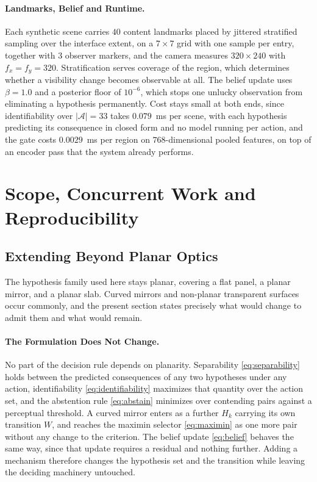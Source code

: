 \documentclass{article} %
\theoremstyle{defstyle}
\theoremstyle{plain}
\begin{document}
\paragraph{Landmarks, Belief and Runtime.}
Each synthetic scene carries $40$ content landmarks placed by jittered stratified sampling
over the interface extent, on a $7 \times 7$ grid with one sample per entry, together with
$3$ observer markers, and the camera measures $320 \times 240$ with $f_x = f_y = 320$.
Stratification serves coverage of the region, which determines whether a visibility change
becomes observable at all. The belief update uses $\beta = 1.0$ and a posterior floor of
$10^{-6}$, which stops one unlucky observation from eliminating a hypothesis permanently.
Cost stays small at both ends, since identifiability over $|\mathcal{A}| = 33$ takes
$0.079$~ms per scene, with each hypothesis predicting its consequence in closed form and no
model running per action, and the gate costs $0.0029$~ms per region on $768$-dimensional
pooled features, on top of an encoder pass that the system already performs.

\section{Scope, Concurrent Work and Reproducibility}

\subsection{Extending Beyond Planar Optics}
\label{sec:supp-extension}

The hypothesis family used here stays planar, covering a flat panel, a planar mirror, and a
planar slab. Curved mirrors and non-planar transparent surfaces occur commonly, and the
present section states precisely what would change to admit them and what would remain.

\paragraph{The Formulation Does Not Change.}
No part of the decision rule depends on planarity. Separability \eqref{eq:separability}
holds between the predicted consequences of any two hypotheses under any action,
identifiability \eqref{eq:identifiability} maximizes that quantity over the action set, and
the abstention rule \eqref{eq:abstain} minimizes over contending pairs against a perceptual
threshold. A curved mirror enters as a further $H_k$ carrying its own transition $W$, and
reaches the maximin selector \eqref{eq:maximin} as one more pair without any change to the
criterion. The belief update \eqref{eq:belief} behaves the same way, since that update
requires a residual and nothing further. Adding a mechanism therefore changes the hypothesis
set and the transition while leaving the deciding machinery untouched.
\end{document}
